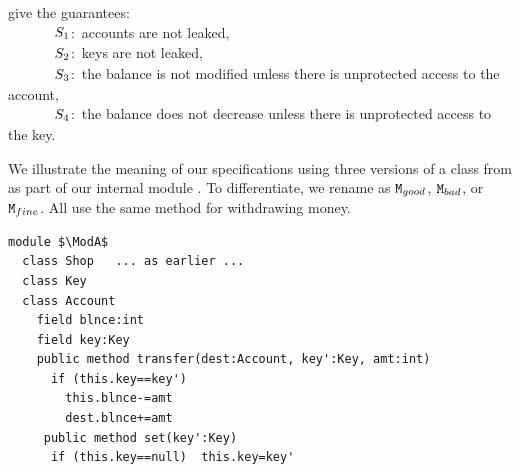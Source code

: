 
\noindent
 give the  guarantees:\\
 $\strut  \ \ \ \ \ \ \ \ \ \   S_1$:\   accounts are not leaked, \\
$\strut   \ \ \ \ \ \ \ \ \ \  S_2$:\    keys are not leaked,\\
$\strut \ \ \ \ \ \ \ \ \ \   S_3$:\  the balance is not modified unless there is unprotected access to the account,  \\%
$\strut \ \ \ \ \ \ \ \ \ \   S_4$:\   the balance does not decrease unless there is unprotected access to the key.  


 
\vspace{.1cm}

\begin{example}
We illustrate the meaning of our specifications  using three  versions of a class   from  \cite{OOPSLA22} 
as part of our internal module \Mshop. 
To differentiate, we rename \Mshop  as $\mbox{\normalfont{\texttt{M}}}_{{good}}$,  $\mbox{\normalfont{\texttt{M}}}_{{bad}}$, or $\mbox{\normalfont{\texttt{M}}}_{{fine}}$. 
All use the same  method for withdrawing money.

%
\begin{lstlisting}[mathescape=true, language=Chainmail, frame=lines]
module $\ModA$      
  class Shop   ... as earlier ...
  class Key
  class Account
    field blnce:int 
    field key:Key
    public method transfer(dest:Account, key':Key, amt:int)
      if (this.key==key')
        this.blnce-=amt
        dest.blnce+=amt
     public method set(key':Key)
      if (this.key==null)  this.key=key'
\end{lstlisting}


\end{example}
